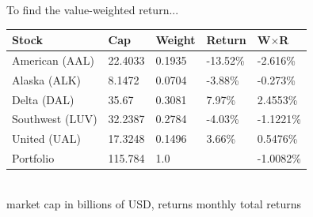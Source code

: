To find the value-weighted return...
\begin{center}
	{\color{blue}
	\begin{tabular}{l|llll}
		\textbf{Stock} & \textbf{Cap} & \textbf{W}eight & \textbf{R}eturn & \textbf{W$\times$R}\\ \hline
		American (AAL) & 22.4033 & 0.1935 & -13.52\% & -2.616\% \\
		Alaska (ALK) & 8.1472 & 0.0704 & -3.88\% & -0.273\% \\
		Delta (DAL) & 35.67 & 0.3081 & 7.97\% & 2.4553\% \\
		Southwest (LUV) & 32.2387 & 0.2784 & -4.03\% & -1.1221\% \\
		United (UAL) & 17.3248 & 0.1496 & 3.66\% & 0.5476\% \\ \hline 
		Portfolio & 115.784 & 1.0 & & -1.0082\%\\\hline
	\end{tabular}
	}\\
	{\footnotesize market cap in billions of USD, returns monthly total returns}
\end{center}